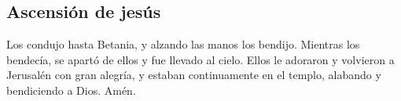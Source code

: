 \hypertarget{ascensiuxf3n-de-jesuxfas}{%
\subsection{Ascensión de jesús}\label{ascensiuxf3n-de-jesuxfas}}

 Los condujo hasta Betania, y alzando las manos los
bendijo.  Mientras los bendecía, se apartó de ellos y fue
llevado al cielo.  Ellos le adoraron y volvieron a
Jerusalén con gran alegría,  y estaban continuamente en
el templo, alabando y bendiciendo a Dios. Amén.
